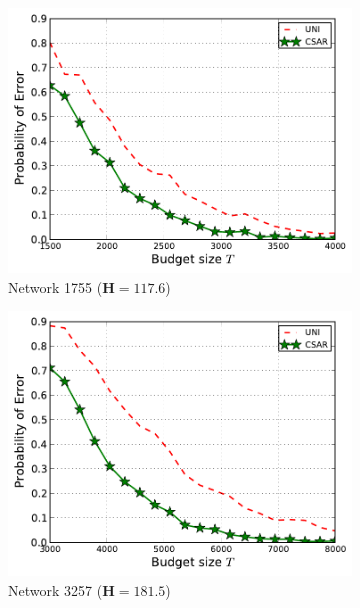 \documentclass{article}
\begin{document}
\begin{figure}[ht]
\centering
\begin{subfigure}[c]{\imgsize\textwidth}
	\includegraphics[width=\textwidth]{fig/exp/mst-1755}
	\caption{Network 1755 ($\mathbf H=117.6$)}
\end{subfigure}
\begin{subfigure}[c]{\imgsize\textwidth}
	\includegraphics[width=\textwidth]{fig/exp/mst-3257}
	\caption{Network 3257 ($\mathbf H=181.5$)}
\end{subfigure}
\begin{subfigure}[c]{\imgsize\textwidth}

\end{subfigure}
\end{figure}
\end{document}

